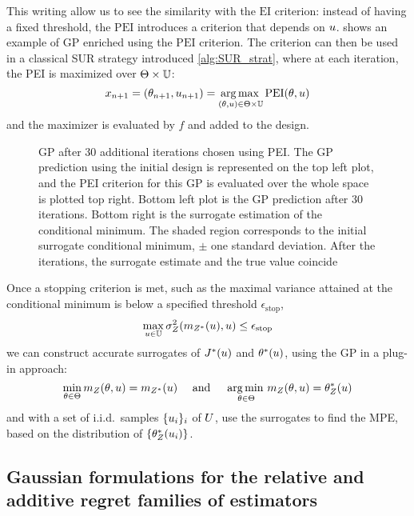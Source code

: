 \documentclass[../../Main_ManuscritThese.tex]{subfiles}
\newcommand\imgpath{/home/victor/acadwriting/Manuscrit/Text/Chapter4/img/}
\begin{document}
This writing allow us to see the similarity with the $\mathrm{EI}$ criterion: instead of having a fixed threshold, the $\mathrm{PEI}$ introduces a criterion that depends on $u$.  shows an example of GP enriched using the $\mathrm{PEI}$ criterion.
The criterion can then be used in a classical SUR strategy introduced \cref{alg:SUR_strat}, where at each iteration, the PEI is maximized over $\Theta \times \mathbb{U}$:
\begin{equation}
  \label{eq:PEI_criterion_SUR}
  x_{n+1}=(\theta_{n+1}, u_{n+1}) =\operatorname*{arg\,max \,}_{(\theta, u)\in \Theta \times \mathbb{U}} \mathrm{PEI}(\theta, u)
\end{equation}
and the maximizer is evaluated by $f$ and added to the design.
\begin{figure}[ht]
  \centering
  
  \caption[Illustration of enrichment using the PEI criterion]{\label{fig:example_PEI} GP after 30 additional iterations chosen using PEI. The GP prediction using the initial design is represented on the top left plot, and the PEI criterion for this GP is evaluated over the whole space is plotted top right. Bottom left plot is the GP prediction after 30 iterations. Bottom right is the surrogate estimation of the conditional minimum. The shaded region corresponds to the initial surrogate conditional minimum, $\pm$ one standard deviation. After the iterations, the surrogate estimate and the true value coincide}
\end{figure}
Once a stopping criterion is met, such as the maximal variance attained at the conditional minimum is below a specified threshold $\epsilon_{\mathrm{stop}}$, 
\begin{equation}
  \max_{u\in\mathbb{U}} \sigma^2_Z(m_{Z^*}(u), u) \leq \epsilon_{\mathrm{stop}}
\end{equation}
we can construct accurate surrogates of $J^*(u)$ and $\theta^*(u)$, using the GP in a plug-in approach:
\begin{equation}
  \min_{\theta\in\Theta} m_Z(\theta,u) = m_{Z^*}(u) \quad \text{ and } \quad \operatorname*{arg\,min \,}_{\theta\in\Theta} m_Z(\theta, u) = \theta_Z^*(u)
\end{equation}
and with a set of i.i.d.\ samples $\{u_i\}_i$ of $U$, use the surrogates to find the MPE, based on the distribution of $\{\theta_Z^*(u_i)\}$.


\clearpage

\subsection{Gaussian formulations for the relative and additive regret families of estimators}
\label{ssec:gp_delta_alpha}
\end{document}

